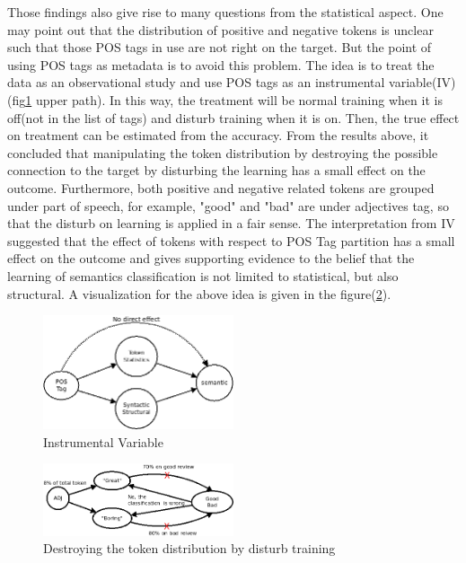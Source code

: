\documentclass[12pt]{article}
\begin{document}
Those findings also give rise to many questions from the statistical aspect. One may point out that the distribution of positive and negative tokens is unclear such that those POS tags in use are not right on the target. But the point of using POS tags as metadata is to avoid this problem. The idea is to treat the data as an observational study and use POS tags as an instrumental variable(IV) (fig\ref{fig:combinIV} upper path). In this way, the treatment will be normal training when it is off(not in the list of tags) and disturb training when it is on. Then, the true effect on treatment can be estimated from the accuracy. From the results above, it concluded that manipulating the token distribution by destroying the possible connection to the target by disturbing the learning has a small effect on the outcome. Furthermore, both positive and negative related tokens are grouped under part of speech, for example, "good" and "bad" are under adjectives tag, so that the disturb on learning is applied in a fair sense. The interpretation from IV suggested that the effect of tokens with respect to POS Tag partition has a small effect on the outcome and gives supporting evidence to the belief that the learning of semantics classification is not limited to statistical, but also structural. A visualization for the above idea is given in the figure(\ref{fig:alwayswrongdetails}). 
\begin{figure} [!h]
\begin{center}
\includegraphics[width=0.5\textwidth]{figures/combin_IV.png}
\caption{Instrumental Variable}
\label{fig:combinIV}
\end{center}
\end{figure}

\begin{figure} [!h]
\begin{center}
\includegraphics[width=0.5\textwidth]{figures/alwayswrong_IV_detail.png}
\caption{Destroying the token distribution by disturb training}
\label{fig:alwayswrongdetails}
\end{center}
\end{figure}
\end{document}
